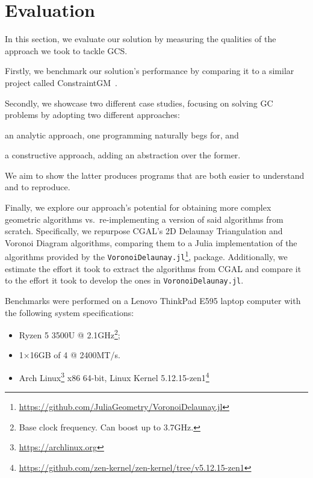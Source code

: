 \section{Evaluation}%
\label{sec:eval}

In this section, we evaluate our solution by measuring the qualities of the
approach we took to tackle \ac{GCS}.

Firstly, we benchmark our solution's performance by comparing it to a
similar project called ConstraintGM~\cite{Pinheiro:2016:MGR}.

Secondly, we showcase two different case studies, focusing on solving \ac{GC}
problems by adopting two different approaches: 
\begin{enumerate*}[label= (\arabic*)]
  \item an analytic approach, one programming naturally begs for, and 
  \item a constructive approach, adding an abstraction over the former.
\end{enumerate*}
We aim to show the latter produces programs that are both easier to understand
and to reproduce.

Finally, we explore our approach's potential for obtaining more complex
geometric algorithms vs.\ re-implementing a version of said algorithms from
scratch.  Specifically, we repurpose \ac{CGAL}'s 2D Delaunay Triangulation and
Voronoi Diagram algorithms, comparing them to a Julia implementation of the
algorithms provided by the
\texttt{VoronoiDelaunay.jl}\footnote{\url{https://github.com/JuliaGeometry/VoronoiDelaunay.jl}},
package.  Additionally, we estimate the effort it took to extract the algorithms
from \ac{CGAL} and compare it to the effort it took to develop the ones in
\texttt{VoronoiDelaunay.jl}.

Benchmarks were performed on a Lenovo{\textregistered}
ThinkPad{\textregistered} E595 laptop computer with the following
system specifications:

\begin{itemize}
  \item {}\label{acro:AMD} Ryzen\textsuperscript{\texttrademark} 5 3500U
  \label{acro:CPU} @ 2.1GHz\footnote{Base clock frequency.  Can boost
  up to 3.7GHz.};
  \item 1×16GB \label{acro:SO-DIMM} of \label{acro:DDR}4
  \label{acro:RAM} @ 2400MT/s.
  \item Arch
  Linux\textsuperscript{\texttrademark}\footnote{\url{https://archlinux.org}}
  x86 64-bit, Linux{\textregistered} Kernel
  5.12.15-zen1\footnote{\url{https://github.com/zen-kernel/zen-kernel/tree/v5.12.15-zen1}}
\end{itemize}




